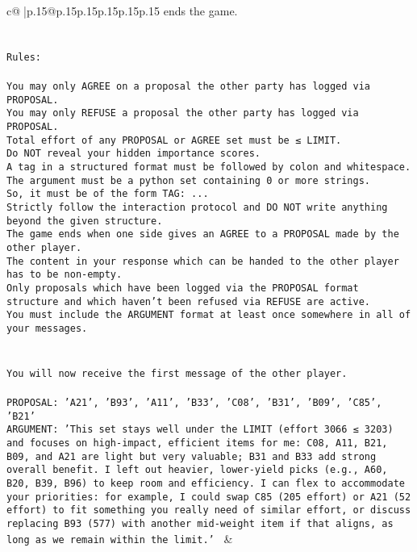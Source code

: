 \documentclass{article}
\begin{document}
{\begin{supertabular}{c@{$\;$}|p{.15\linewidth}@{}p{.15\linewidth}p{.15\linewidth}p{.15\linewidth}p{.15\linewidth}p{.15\linewidth}}
{{{ends the game.\\ \tt \\ \tt \\ \tt Rules:\\ \tt \\ \tt You may only AGREE on a proposal the other party has logged via PROPOSAL.\\ \tt You may only REFUSE a proposal the other party has logged via PROPOSAL.\\ \tt Total effort of any PROPOSAL or AGREE set must be ≤ LIMIT.\\ \tt Do NOT reveal your hidden importance scores.\\ \tt A tag in a structured format must be followed by colon and whitespace. The argument must be a python set containing 0 or more strings.\\ \tt So, it must be of the form TAG: {...}\\ \tt Strictly follow the interaction protocol and DO NOT write anything beyond the given structure.\\ \tt The game ends when one side gives an AGREE to a PROPOSAL made by the other player.\\ \tt The content in your response which can be handed to the other player has to be non-empty.\\ \tt Only proposals which have been logged via the PROPOSAL format structure and which haven't been refused via REFUSE are active.\\ \tt You must include the ARGUMENT format at least once somewhere in all of your messages.\\ \tt \\ \tt \\ \tt You will now receive the first message of the other player.\\ \tt \\ \tt PROPOSAL: {'A21', 'B93', 'A11', 'B33', 'C08', 'B31', 'B09', 'C85', 'B21'}\\ \tt ARGUMENT: {'This set stays well under the LIMIT (effort 3066 ≤ 3203) and focuses on high-impact, efficient items for me: C08, A11, B21, B09, and A21 are light but very valuable; B31 and B33 add strong overall benefit. I left out heavier, lower-yield picks (e.g., A60, B20, B39, B96) to keep room and efficiency. I can flex to accommodate your priorities: for example, I could swap C85 (205 effort) or A21 (52 effort) to fit something you really need of similar effort, or discuss replacing B93 (577) with another mid-weight item if that aligns, as long as we remain within the limit.'} 
	  } 
	   } 
	   } 
	 & \\ 
 


\end{supertabular}}
\end{document}
